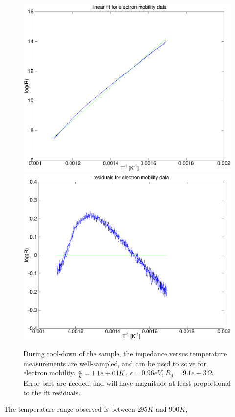 \documentclass[12pt,oneside,english]{article}
\begin{document}
	\begin{figure}
	
	\includegraphics[scale=0.4]{images/electron_mobility.eps} 
	\includegraphics[scale=0.4]{images/electron_mobility_residual.eps}
	\label{f:emobility}
	\caption{During cool-down of the sample, the impedance versus temperature measurements are well-sampled, and can be used to solve for electron mobility.  ${\epsilon\over{k}} = 1.1e+04 K$, $\epsilon = 0.96 eV$, $R_0 = 9.1e-3\Omega$.  Error bars are needed, and will have magnitude at least proportional to the fit residuals.}
	\end{figure}
	The temperature range observed is between $295K$ and $900K$, 
	
\end{document}

